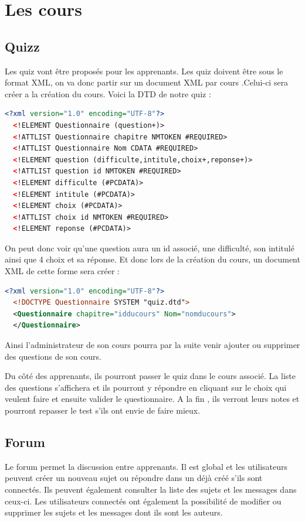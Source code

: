 \documentclass[a4paper,10pt]{article}
\begin{document}
\section{Les cours}
\subsection{Quizz}
Les quiz vont être proposés pour les apprenants. Les quiz doivent être sous le format XML, on va donc partir sur un document XML par cours .Celui-ci sera créer a la création du cours.
Voici la DTD de notre quiz : 
\begin{lstlisting}[language=XML]
  <?xml version="1.0" encoding="UTF-8"?>
  <!ELEMENT Questionnaire (question+)>
  <!ATTLIST Questionnaire chapitre NMTOKEN #REQUIRED>
  <!ATTLIST Questionnaire Nom CDATA #REQUIRED>
  <!ELEMENT question (difficulte,intitule,choix+,reponse+)>
  <!ATTLIST question id NMTOKEN #REQUIRED>
  <!ELEMENT difficulte (#PCDATA)>
  <!ELEMENT intitule (#PCDATA)>
  <!ELEMENT choix (#PCDATA)>
  <!ATTLIST choix id NMTOKEN #REQUIRED>
  <!ELEMENT reponse (#PCDATA)>
\end{lstlisting}
On peut donc voir qu'une question aura un id associé, une difficulté, son intitulé ainsi que 4 choix et sa réponse.
Et donc lors de la création du cours, un document XML de cette forme sera créer : 
\begin{lstlisting}[language=XML]
  <?xml version="1.0" encoding="UTF-8"?>
  <!DOCTYPE Questionnaire SYSTEM "quiz.dtd">
  <Questionnaire chapitre="idducours" Nom="nomducours"> 
  </Questionnaire>
\end{lstlisting} 

Ainsi l'administrateur de son cours pourra par la suite venir ajouter ou supprimer des questions de son cours. 

Du côté des apprenants, ils pourront passer le quiz dans le cours associé. La liste des questions s'affichera et ils pourront y répondre en cliquant sur le choix qui veulent faire et ensuite valider le questionnaire.
A la fin , ils verront leurs notes et pourront repasser le test s'ils ont envie de faire mieux.
\subsection{Forum}
Le forum permet la discussion entre apprenants. Il est global et les utilisateurs peuvent créer un nouveau sujet ou répondre dans un déjà créé s'ils sont connectés. Ils peuvent également consulter la liste des sujets et les messages dans ceux-ci. Les utilisateurs connectés ont également la possibilité de modifier ou supprimer les sujets et les messages dont ils sont les auteurs.
\end{document}
